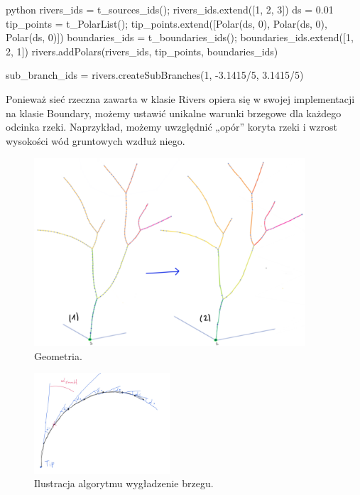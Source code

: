 \documentclass[]{pracamgr}
\begin{document}
      \begin{mintedbox}{python}
        rivers_ids = t_sources_ids(); rivers_ids.extend([1, 2, 3])
        ds = 0.01
        tip_points = t_PolarList(); tip_points.extend([Polar(ds, 0), Polar(ds, 0), Polar(ds, 0)])
        boundaries_ids = t_boundaries_ids(); boundaries_ids.extend([1, 2, 1])
        rivers.addPolars(rivers_ids, tip_points, boundaries_ids)
      
        sub_branch_ids = rivers.createSubBranches(1, -3.1415/5, 3.1415/5)\end{mintedbox}

      Ponieważ sieć rzeczna zawarta w klasie Rivers opiera się w swojej implementacji na klasie Boundary, możemy ustawić unikalne warunki brzegowe dla każdego odcinka rzeki. Naprzykład, możemy uwzględnić „opór” koryta rzeki i wzrost wysokości wód gruntowych wzdłuż niego.

      \begin{figure}[H]
        \centering
        \includegraphics[width=0.9\textwidth]{figs/tree_coarsening.png}        
        \caption {Geometria.}
        \label{tree_coarsening}
      \end{figure}

      \begin{figure}
        \begin{center}
          \vspace{-20pt}
          \includegraphics[width=0.45\textwidth]{figs/descritization_reducing.jpg}
        \end{center}
        \caption {Ilustracja algorytmu wygładzenie brzegu.}
        \label{descritization_reducing}
      \end{figure}
\end{document}
